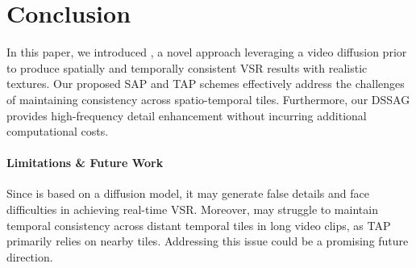 \section{Conclusion}
In this paper, we introduced \ours{}, a novel approach leveraging a video diffusion prior to produce spatially and temporally consistent VSR results with realistic textures. Our proposed SAP and TAP schemes effectively address the challenges of maintaining consistency across spatio-temporal tiles. Furthermore, our DSSAG provides high-frequency detail enhancement without incurring additional computational costs.

\paragraph{Limitations \& Future Work}
Since \ours{} is based on a diffusion model, it may generate false details and face difficulties in achieving real-time VSR. Moreover, \ours{} may struggle to maintain temporal consistency across distant temporal tiles in long video clips, as TAP primarily relies on nearby tiles. Addressing this issue could be a promising future direction.
